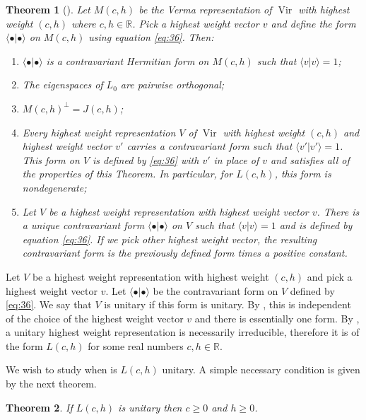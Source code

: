 \documentclass[a4paper, 12pt, reqno]{amsart}
\newtheorem{theorem}{Theorem}[section]
\theoremstyle{remark}
\numberwithin{equation}{subsection}
\DeclareMathOperator{\Vir}{Vir}
\begin{document}
\begin{theorem}[{\cite[Proposition 3.4]{kac_bombay_2013}}]
  \label{thr:31}
  Let $M(c, h)$ be the Verma representation of $\Vir$ with highest weight $(c, h)$ where $c, h \in \mathbb{R}$.
  Pick a highest weight vector $v$ and define the form $\langle \bullet| \bullet\rangle$ on $M(c, h)$ using equation \eqref{eq:36}.
  Then:
  \begin{enumerate}
  \item $\langle \bullet| \bullet\rangle$ is a contravariant Hermitian form on $M(c, h)$ such that $\langle v| v\rangle = 1$;
  \item The eigenspaces of $L_0$ are pairwise orthogonal;
  \item $M(c, h)^{\perp} = J(c, h)$;
  \item Every highest weight representation $V$ of $\Vir$ with highest weight $(c, h)$ and highest weight vector $v'$ carries a contravariant form such that $\langle v'| v'\rangle = 1$.
    This form on $V$ is defined by \eqref{eq:36} with $v'$ in place of $v$ and satisfies all of the properties of this Theorem.
    In particular, for $L(c, h)$, this form is nondegenerate;
  \item Let $V$ be a highest weight representation with highest weight vector $v$.
    There is a unique contravariant form $\langle \bullet| \bullet\rangle$ on $V$ such that $\langle v| v\rangle = 1$ and is defined by equation \eqref{eq:36}.
    If we pick other highest weight vector, the resulting contravariant form is the previously defined form times a positive constant.
  \end{enumerate}
\end{theorem}

Let $V$ be a highest weight representation with highest weight $(c, h)$ and pick a highest weight vector $v$.
Let $\langle \bullet| \bullet\rangle$ be the contravariant form on $V$ defined by \eqref{eq:36}.
We say that $V$ is unitary if this form is unitary.
By , this is independent of the choice of the highest weight vector $v$ and there is essentially one form.
By , a unitary highest weight representation is necessarily irreducible, therefore it is of the form $L(c, h)$ for some real numbers $c, h \in \mathbb{R}$.

We wish to study when is $L(c, h)$ unitary.
A simple necessary condition is given by the next theorem.

\begin{theorem}
  \label{thr:32}
  If $L(c, h)$ is unitary then $c \ge 0$ and $h \ge 0$.
\end{theorem}
\end{document}
